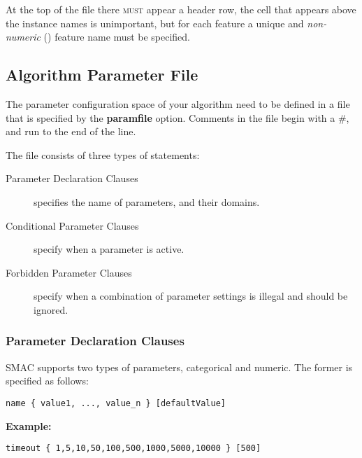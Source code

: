 \documentclass[manual.tex]{subfiles}
\begin{document}
At the top of the file there \textsc{must} appear a header row, the cell that appears above the instance names is unimportant, but for each feature a unique and \emph{non-numeric} () feature name must be specified.

\subsection{Algorithm Parameter File} \label{sec:paramfile}

 


The parameter configuration space of your algorithm need to be defined in a file
that is specified by the \textbf{paramfile} option. Comments in the file begin 
with a \#, and run to the end of the line.

The file consists of three types of statements:
\begin{description}
\item[Parameter Declaration Clauses] specifies the name of parameters, and their domains.
\item[Conditional Parameter Clauses] specify when a parameter is active.
\item[Forbidden Parameter Clauses] specify when a combination of parameter settings is illegal and should be ignored.
\end{description}

\subsubsection{Parameter Declaration Clauses}\label{sec:param_decl_clauses}

SMAC supports two types of parameters, categorical and numeric. The former is specified as follows:

\texttt{name~\{~value1,~...,~value\_n~\}~{[}defaultValue{]}}

\vspace{5pt}
\textbf{Example:}
\vspace{2pt}


\texttt{timeout~\{~1,5,10,50,100,500,1000,5000,10000~\}~{[}500{]}}
\end{document}
